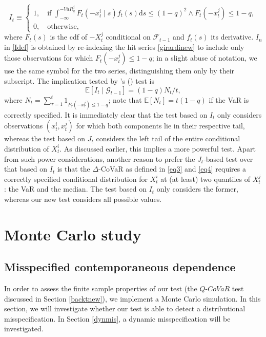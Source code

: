 \documentclass[12pt]{article}
\begin{document}
\begin{equation}\label{girardinew}
I_t\equiv \begin{cases}1,\quad \mbox{if } \int_{-\infty}^{-VaR^j_q}F_t (-x^{i}_t\mid s)f_t(s)\mathrm{d}s\leq (1-q)^2 \wedge F_t (-x^{j}_t) \leq 1-q,\\0,\quad \mbox{otherwise,}\end{cases}
\end{equation}
where $F_t (s)$ is the cdf of $-X_t^j$ conditional on $\mathcal{F}_{t-1}$ and $f_t(s)$ its derivative. $I_n$ in \eqref{Idef} is obtained by re-indexing the hit series \eqref{girardinew} to include only those observations for which $ F_t (-x^{j}_t) \leq 1-q$; in a slight abuse of notation, we use the same symbol for the two series, distinguishing them only by their subscript.  The implication tested by \citeauthor{girardi}'s (\citeyear{girardi}) test is
\[
\mathbb{E}[I_t\mid \mathcal{G}_{t-1}]=(1-q)N_t/t,
\]
where $N_t=\sum_{\tau=1}^t 1_{F_\tau (-x^{j}_\tau) \leq 1-q}$; note that $\mathbb{E}[N_t]=t(1-q)$ if the VaR is correctly specified.
It is immediately clear that the test based on $I_t$ only considers observations $(x_t^i, x_t^j)$ for which both components lie in their respective tail, whereas the test based on $J_t$ considers the  left tail of the entire conditional distribution of $X^i_t$. As discussed earlier, this implies a more powerful test. Apart from such power considerations, another reason to prefer the $J_t$-based test over that based on $I_t$ is that the $\Delta$-CoVaR as defined in \eqref{eq3} and \eqref{eq4} requires a correctly specified conditional distribution for $X_t^i$ at (at least) two quantiles of $X_t^j$: the VaR and the median. The test based on $I_t$ only considers the former, whereas our new test considers all possible values.

\section{Monte Carlo study}

\subsection{Misspecified contemporaneous dependence} \label{dismisspc}

In order to assess the finite sample properties of our test (the $Q$-$CoVaR$ test discussed in Section \ref{backtnew}), we implement a Monte Carlo simulation. In this section, we will investigate whether  our test is able to detect a distributional misspecification. In Section \ref{dynmis}, a dynamic misspecification will be investigated.
\end{document}

